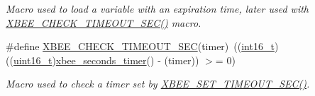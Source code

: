 \begin{DoxyCompactItemize}
\begin{DoxyCompactList}\small\item\em Macro used to load a variable with an expiration time, later used with \hyperlink{group__hal_ga858c3c1caa899efd6af9ee8a0fe09246}{X\+B\+E\+E\+\_\+\+C\+H\+E\+C\+K\+\_\+\+T\+I\+M\+E\+O\+U\+T\+\_\+\+S\+E\+C()} macro. \end{DoxyCompactList}\item 
\#define \hyperlink{group__hal_ga858c3c1caa899efd6af9ee8a0fe09246}{X\+B\+E\+E\+\_\+\+C\+H\+E\+C\+K\+\_\+\+T\+I\+M\+E\+O\+U\+T\+\_\+\+S\+EC}(timer)~((\hyperlink{group__hal__dos_ga2140805d08462d474b82ddc8d1c2f3e6}{int16\+\_\+t})((\hyperlink{group__hal__dos_ga5a8b2dc9e45a9ee81a94ef304fb62505}{uint16\+\_\+t})\hyperlink{group__hal_ga5c1a8bccd41acf1d7264a75698077749}{xbee\+\_\+seconds\+\_\+timer}() -\/ (timer)) $>$= 0)
\begin{DoxyCompactList}\small\item\em Macro used to check a timer set by \hyperlink{group__hal_ga6adb5c9e19c84a261c569ff4d77d1170}{X\+B\+E\+E\+\_\+\+S\+E\+T\+\_\+\+T\+I\+M\+E\+O\+U\+T\+\_\+\+S\+E\+C()}. \end{DoxyCompactList}\end{DoxyCompactItemize}
